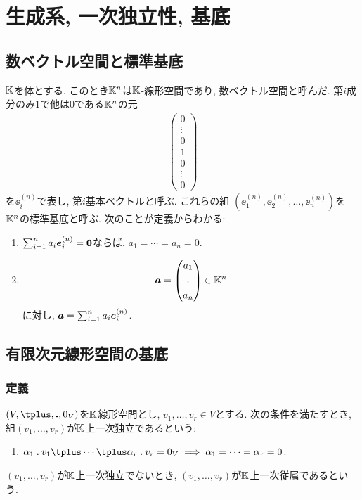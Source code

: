 \chapter{生成系, 一次独立性, 基底}
\label{chap:basis}
\section{数ベクトル空間と標準基底}
$\mathbb{K}$を体とする.
このとき$\mathbb{K}^n$は$\mathbb{K}$-線形空間であり,
数ベクトル空間と呼んだ.
第$i$成分のみ$1$で他は$0$である$\mathbb{K}^n$の元
\begin{align*}
  \begin{pmatrix}0\\\vdots\\0\\1\\0\\\vdots\\0\end{pmatrix}
\end{align*}
を$\ee^{(n)}_i$で表し,
第$i$基本ベクトルと呼ぶ.
これらの組 $(\ee^{(n)}_1,\ee^{(n)}_2,\ldots,\ee^{(n)}_n)$を
$\mathbb{K}^n$の標準基底と呼ぶ.
次のことが定義からわかる:
\begin{enumerate}
  \item
    $\sum_{i=1}^na_i\boldsymbol{e}^{(n)}_i=\boldsymbol{0}$ならば, $a_1=\cdots=a_n=0$.
\item
    \begin{align*}
      \boldsymbol{a}=\begin{pmatrix}a_1\\\vdots\\a_n\end{pmatrix}\in\mathbb{K}^n
    \end{align*}
    に対し, $\boldsymbol{a}=\sum_{i=1}^na_i\boldsymbol{e}^{(n)}_i$.
\end{enumerate}


\section{有限次元線形空間の基底}
\subsection{定義}


\begin{definition}
  $(V,\plus,\act,0_V)$を$\mathbb{K}$線形空間とし,
  $v_1,\ldots,v_r\in V$とする.
  次の条件を満たすとき,
  組$(v_1,\ldots,v_r)$が$\mathbb{K}$上一次独立であるという:
  \begin{enumerate}
  \item $\alpha_1\act v_1\plus\cdots\plus \alpha_r\act v_r=0_V \implies \alpha_1=\cdots=\alpha_r=0$.
  \end{enumerate}
  $(v_1,\ldots,v_r)$が$\mathbb{K}$上一次独立でないとき,
  $(v_1,\ldots,v_r)$が$\mathbb{K}$上一次従属であるという.
\end{definition}

